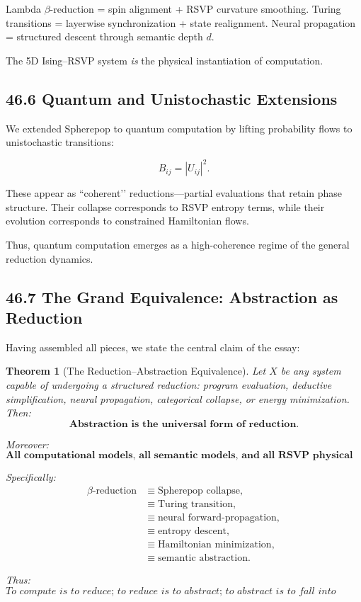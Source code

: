 \documentclass[12pt,letterpaper]{article}
\newtheorem{theorem}{Theorem}[section]
\theoremstyle{remark}
\begin{document}
Lambda $\beta$-reduction  
= spin alignment + RSVP curvature smoothing.  
Turing transitions  
= layerwise synchronization + state realignment.  
Neural propagation  
= structured descent through semantic depth $d$.

The 5D Ising–RSVP system \emph{is} the physical instantiation of computation.

\subsection{46.6 Quantum and Unistochastic Extensions}

We extended Spherepop to quantum computation by lifting probability flows 
to unistochastic transitions:

\[
B_{ij} = |U_{ij}|^2.
\]

These appear as ``coherent’’ reductions—partial evaluations that retain phase structure.
Their collapse corresponds to RSVP entropy terms, 
while their evolution corresponds to constrained Hamiltonian flows.

Thus, quantum computation emerges as a high-coherence regime 
of the general reduction dynamics.

\subsection{46.7 The Grand Equivalence: Abstraction as Reduction}

Having assembled all pieces, we state the central claim of the essay:

\begin{theorem}[The Reduction–Abstraction Equivalence]
Let $X$ be any system capable of undergoing a structured reduction:
program evaluation, deductive simplification, neural propagation, 
categorical collapse, or energy minimization.
Then:
\[
\boxed{
\textbf{Abstraction is the universal form of reduction.}
}
\]

Moreover:
\[
\textbf{
All computational models,  
all semantic models,  
and all RSVP physical models  
instantiate the same reduction dynamics.}
\]

Specifically:
\[
\begin{aligned}
\beta\text{-reduction}
&\equiv \text{Spherepop collapse},\\
&\equiv \text{Turing transition},\\
&\equiv \text{neural forward-propagation},\\
&\equiv \text{entropy descent},\\
&\equiv \text{Hamiltonian minimization},\\
&\equiv \text{semantic abstraction}.
\end{aligned}
\]

Thus:
\[
\boxed{
\textit{To compute is to reduce;  
to reduce is to abstract;  
to abstract is to fall into alignment with the structure of meaning.}
}
\]
\end{theorem}
\end{document}
